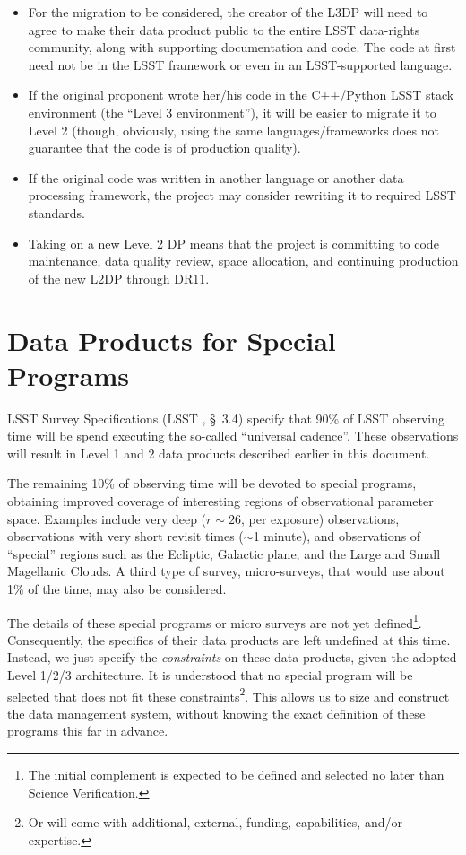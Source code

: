 \documentclass[SE,lsstdraft,toc]{lsstdoc}
\newcommand{\marginreq}[1]{\marginpar{\hspace{0pt}\tiny #1}}
\newcommand{\lsrreq}[1]{\marginreq{LSR-REQ-#1}}
\begin{document}
\begin{itemize}
\item For the migration to be considered, the creator of the L3DP will need to agree to make their data product public to the entire LSST data-rights community, along with supporting documentation and code. The code at first need not be in the LSST framework or even in an LSST-supported language.
\item If the original proponent wrote her/his code in the C++/Python LSST stack environment (the ``Level 3 environment''), it will be easier to migrate it to Level 2 (though, obviously, using the same languages/frameworks does not guarantee that the code is of production quality).
\item If the original code was written in another language or another data processing framework, the project may consider rewriting it to required LSST standards.
\item Taking on a new Level 2 DP means that the project is committing to code maintenance, data quality review, space allocation, and continuing production of the new L2DP through DR11.
\end{itemize}

\clearpage

\section{Data Products for Special Programs}
\label{sec:specialProgs}

\lsrreq{0075}
LSST Survey Specifications (LSST \SRD, \S~3.4) specify that 90\% of LSST observing time will be spend executing the so-called ``universal cadence''. These observations will result in Level 1 and 2 data products described earlier in this document.

The remaining 10\% of observing time will be devoted to special programs, obtaining improved coverage of interesting regions of observational parameter space. Examples include very deep ($r \sim 26$, per exposure) observations, observations with very short revisit times ($\sim$1 minute), and observations of ``special'' regions such as the Ecliptic, Galactic plane, and the Large and Small Magellanic Clouds. A third type of survey, micro-surveys, that would use about 1\% of the time, may also be considered.

The details of these special programs or micro surveys are not yet defined\footnote{The initial complement is expected to be defined and selected no later than Science Verification.}. Consequently, the specifics of their data products are left undefined at this time. Instead, we just specify the \emph{constraints} on these data products, given the adopted Level 1/2/3 architecture. It is understood that no special program will be selected that does not fit these constraints\footnote{Or will come with additional, external, funding, capabilities, and/or expertise.}. This allows us to size and construct the data management system, without knowing the exact definition of these programs this far in advance.
\end{document}
